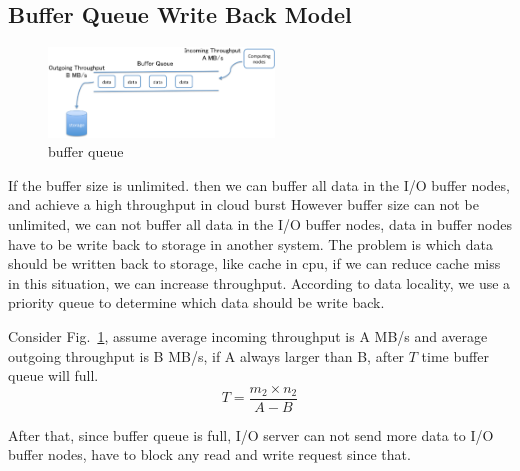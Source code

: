 
\subsection{Buffer Queue Write Back Model}

\begin{figure}[tb]
	\centering
	\includegraphics[width=6cm]{../img/buffer_queue}
	\caption{buffer queue}
	\label{buffer queue}
\end{figure}

If the buffer size is unlimited. then we can buffer all data in the I/O buffer nodes, and achieve a high throughput in cloud burst%
However buffer size can not be unlimited, we can not buffer all data in the I/O buffer nodes, data in buffer nodes have to be write back to storage in another system.
The problem is which data should be written back to storage, like cache in cpu, if we can reduce cache miss in this situation, we can increase throughput. 
According to data locality, we use a priority queue to determine which data should be write back.

Consider Fig.~\ref{buffer queue}, assume average incoming throughput is A MB/s and average outgoing throughput is B MB/s, if A always larger than B, after $T$ time buffer queue will full.
\begin{equation}
T=\frac{m_2\times n_2}{A-B}
\end{equation}

After that, since buffer queue is full, I/O server can not send more data to I/O buffer nodes, have to block any read and write request since that.
